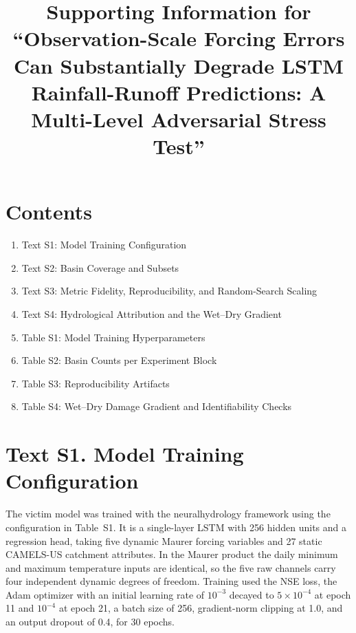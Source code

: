 \documentclass[final]{agujournal2019}
\begin{document}
\renewcommand{\thetable}{S\arabic{table}}
\renewcommand{\thefigure}{S\arabic{figure}}

\title{Supporting Information for ``Observation-Scale Forcing Errors Can Substantially Degrade LSTM Rainfall-Runoff Predictions: A Multi-Level Adversarial Stress Test''}


\section*{Contents}
\begin{enumerate}
\item Text S1: Model Training Configuration
\item Text S2: Basin Coverage and Subsets
\item Text S3: Metric Fidelity, Reproducibility, and Random-Search Scaling
\item Text S4: Hydrological Attribution and the Wet--Dry Gradient
\item Table S1: Model Training Hyperparameters
\item Table S2: Basin Counts per Experiment Block
\item Table S3: Reproducibility Artifacts
\item Table S4: Wet--Dry Damage Gradient and Identifiability Checks
\end{enumerate}

\section*{Text S1. Model Training Configuration}

The victim model was trained with the neuralhydrology framework \cite{Kratzert2022} using the configuration in Table~S1. It is a single-layer LSTM with 256 hidden units and a regression head, taking five dynamic Maurer forcing variables and 27 static CAMELS-US catchment attributes. In the Maurer product the daily minimum and maximum temperature inputs are identical, so the five raw channels carry four independent dynamic degrees of freedom. Training used the NSE loss, the Adam optimizer with an initial learning rate of $10^{-3}$ decayed to $5\times10^{-4}$ at epoch 11 and $10^{-4}$ at epoch 21, a batch size of 256, gradient-norm clipping at 1.0, and an output dropout of 0.4, for 30 epochs.
\end{document}
